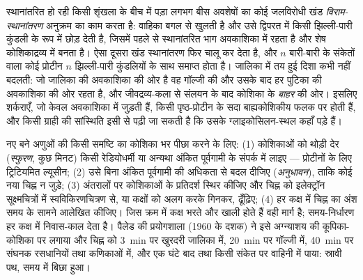 \begin{proposition}[झिल्ली प्रोटीन और सांस्थिति]\label{prop:b3:membrane-traffic:topology}
स्थानांतरित हो रही किसी शृंखला के बीच में पड़ा लगभग बीस अवशेषों का कोई
जलविरोधी खंड \emph{विराम-स्थानांतरण} अनुक्रम का काम करता है: वाहिका
बगल से खुलती है और उसे द्विपरत में किसी झिल्ली-पारी कुंडली के रूप में
छोड़ देती है, जिसमें पहले से स्थानांतरित भाग अवकाशिका में रहता है और
शेष कोशिकाद्रव्य में बनता है। ऐसा दूसरा खंड स्थानांतरण फिर चालू कर देता
है, और $n$ बारी-बारी के संकेतों वाला कोई प्रोटीन
$n$ झिल्ली-पारी कुंडलियों के साथ समाप्त होता है। जालिका में तय हुई दिशा
कभी नहीं बदलती: जो जालिका की अवकाशिका की ओर है वह गॉल्जी की और उसके बाद
हर पुटिका की अवकाशिका की ओर रहता है, और जीवद्रव्य-कला से संलयन के बाद
कोशिका के \emph{बाहर} की ओर। इसलिए शर्कराएँ, जो केवल अवकाशिका में जुड़ती
हैं, किसी पृष्ठ-प्रोटीन के सदा बाह्यकोशिकीय फलक पर होती हैं, और किसी
ग्राही की सांस्थिति इसी से पढ़ी जा सकती है कि उसके ग्लाइकोसिलन-स्थल
कहाँ पड़े हैं।
\end{proposition}

\begin{method}[स्फुरण--अनुधावन]\label{met:b3:membrane-traffic:pulse-chase}
नए बने अणुओं की किसी समष्टि का कोशिका भर पीछा करने के लिए: (1)
कोशिकाओं को थोड़ी देर (\emph{स्फुरण}, कुछ मिनट) किसी रेडियोधर्मी या
अन्यथा अंकित पूर्वगामी के संपर्क में लाइए --- प्रोटीनों के लिए
ट्रिटियमित ल्यूसीन; (2) उसे बिना अंकित पूर्वगामी की अधिकता से बदल
दीजिए (\emph{अनुधावन}), ताकि कोई नया चिह्न न जुड़े; (3) अंतरालों पर
कोशिकाओं के प्रतिदर्श स्थिर कीजिए और चिह्न को इलेक्ट्रॉन
सूक्ष्मचित्रों में स्वविकिरणचित्रण से, या कक्षों को अलग करके गिनकर,
ढूँढ़िए; (4) हर कक्ष में चिह्न का अंश समय के सामने आलेखित कीजिए। जिस
क्रम में कक्ष भरते और खाली होते हैं वही मार्ग है; समय-निर्धारण हर कक्ष
में निवास-काल देता है। पैलेड की प्रयोगशाला (1960 के दशक) ने इसे
अग्न्याशय की कूपिका-कोशिका पर लगाया और चिह्न को \qty{3}{min} पर खुरदरी
जालिका में, \qty{20}{min} पर गॉल्जी में, \qty{40}{min} पर संघनक
रसधानियों तथा कणिकाओं में, और एक घंटे बाद तथा किसी संकेत पर वाहिनी में
पाया: स्रावी पथ, समय में बिछा हुआ।
\end{method}

